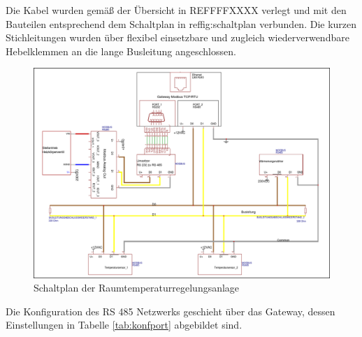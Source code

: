 Die Kabel wurden gemäß der Übersicht in REFFFFXXXX verlegt und mit den Bauteilen entsprechend dem Schaltplan in ref{fig:schaltplan} verbunden. Die kurzen Stichleitungen wurden über flexibel einsetzbare und zugleich wiederverwendbare Hebelklemmen an die lange Busleitung angeschlossen.


\begin{figure}
\centering
\includegraphics[width=\textwidth]{abbildungen/20160326_schaltplan}
\caption{Schaltplan der Raumtemperaturregelungsanlage}
\label{fig:schaltplan}
\end{figure}

Die Konfiguration des RS 485 Netzwerks geschieht über das Gateway, dessen Einstellungen in Tabelle \ref{tab:konfport} abgebildet sind.

